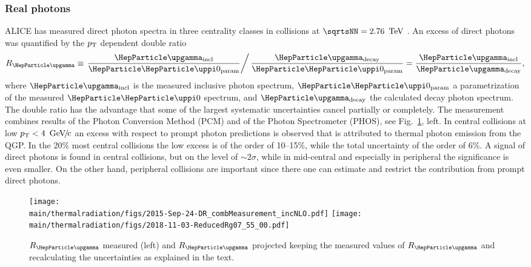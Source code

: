 \subsubsection{Real photons}

ALICE has measured direct photon spectra in three centrality classes in \PbPb collisions at $\sqrtsNN=\unit[2.76]{\UTeV}$ \cite{Adam:2015lda}. 
An excess of direct photons
was quantified by the $p\sb{\scriptstyle\mathrm{T}}$ dependent double ratio
\begin{equation}
  \label{eq:doubleratio}
  R_{\PGg}  \equiv \left . \frac{\PGg_{\mathrm{incl}}}{\PGpz_{\mathrm{param}}} \right / \frac{\PGg_{\mathrm{decay}}}{\PGpz_{\mathrm{param}}}
 = \frac{\PGg_{\mathrm{incl}}}{\PGg_{\mathrm{decay}}}, 
\end{equation}
where $\PGg_{\mathrm{incl}}$ is the measured inclusive photon spectrum, $\PGpz_{\mathrm{param}}$ a parametrization of the measured $\PGpz$ spectrum, and $\PGg_{\mathrm{decay}}$ the calculated decay photon spectrum. The double ratio has the advantage that some of the largest systematic uncertainties cancel partially or completely. 
The measurement combines results of the Photon Conversion Method (PCM) and of the Photon Spectrometer (PHOS), see Fig.~\ref{fig:RealPhotonsRg}, left. In central collisions at low $\pT  < \unit[4]{\UGeVc}$ an excess with respect to prompt photon predictions is observed that is attributed to thermal photon emission from the QGP. In the 20\% most central collisions the low \pT{} excess is of the order of 10--15\%, while the total uncertainty of the order of 6\%. A signal of direct photons is found in central collisions, but on the level of $\sim 2\sigma$, while in mid-central and especially in peripheral the significance is even smaller. On the other hand, peripheral collisions are important since there one can estimate and restrict the contribution from prompt direct photons.  

\begin{figure}[hbt]
\centering
\texttt{[image: \\main/thermalradiation/figs/2015-Sep-24-DR\_combMeasurement\_incNLO.pdf]}
\hfill
\texttt{[image: \\main/thermalradiation/figs/2018-11-03-ReducedRg07\_55\_00.pdf]}
\caption{$R_{\PGg}$ measured \cite{Adam:2015lda} (left) and $R_{\PGg}$ projected keeping the measured values of $R_{\PGg}$ and recalculating the uncertainties as explained in the text.}
\label{fig:RealPhotonsRg}
\end{figure}

